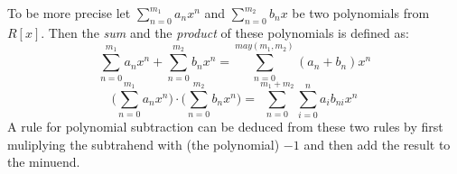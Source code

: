To be more precise let $ \sum _{n = 0} ^{m_1}{a} _{n}{x} ^{n} $ and
$ \sum _{n = 0} ^{m_2}{b} _{n}{x} $ be two polynomials from $ R[x]$. Then the \textit{sum} and the \textit{product} of these polynomials is defined as:
\begin{equation}
\sum _{n = 0} ^{m_1}{a} _{n}{x} ^{n} + \sum _{n = 0} ^{m_2}{b} _{n}{x } ^{n} = \sum _{n = 0} ^{may(m_1,m_2)}{({a} _{n} +{b} _{n})}{x} ^{n}
\end{equation}
\begin{equation}
\bigg (\sum _{n = 0} ^{m_1}{a} _{n}{x} ^{n} \bigg) \cdot \bigg (\sum _{n = 0} ^{m_2 }{b} _{n}{x} ^{n} \bigg) = \sum _{n = 0} ^{m_1+m_2} \sum _{i = 0} ^{n}{a} _{i }{{b} _{ni}}{x} ^{n}
\end{equation}
A rule for polynomial subtraction can be deduced from these two rules by first muliplying the subtrahend with (the polynomial) $-1$ and then add the result to the minuend.

